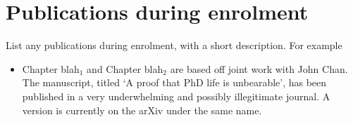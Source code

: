 \section*{Publications during enrolment}

{\color{blue}List any publications during enrolment, with a short description. For example
\begin{itemize}
\item Chapter blah$_{1}$ and Chapter blah$_{2}$ are based off joint work with John Chan. The manuscript, titled `A proof that PhD life is unbearable', has been published in a very underwhelming and possibly illegitimate journal. A version is currently on the arXiv under the same name.
\end{itemize}
}

\clearpage
